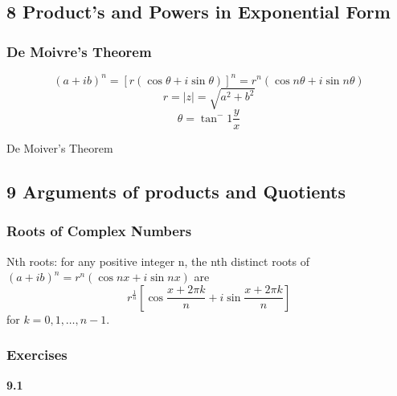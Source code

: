 \subsection{8 Product's and Powers in Exponential Form}

\subsubsection{De Moivre's Theorem}
$$
(a + ib)^n = [r(\cos \theta + i \sin \theta)]^n = r^n (\cos n\theta + i \sin n\theta)
$$
$$
r = |z| = \sqrt{a^2 + b^2}
$$
$$
\theta = \tan^-1 \frac{y}{x}
$$

De Moiver's Theorem 

\subsection{9 Arguments of products and Quotients}

\subsubsection{Roots of Complex Numbers}

Nth roots: for any positive integer n, the nth distinct roots of
$(a+ ib)^n = r^n (\cos nx +i\sin nx)$ are
$$
r^{\frac{1}{n}} \left[\cos \frac{x + 2\pi k}{n} + i\sin \frac{x + 2\pi k}{n}\right]
$$
for $k = 0, 1, \dots, n-1$.


\subsubsection{Exercises}

\textbf{9.1}
\\

